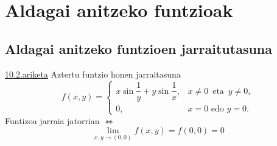\chapter{Aldagai anitzeko funtzioak}
\section{Aldagai anitzeko funtzioen jarraitutasuna}
\underline{10.2.ariketa} Aztertu funtzio honen jarraitasuna
$$f(x,y) = \left\{ \begin{array}{cl}
		x\sin \dfrac{1}{y} +y \sin \dfrac{1}{x},  &  x \neq 0 \, \mbox{ eta } \, y \neq 0, \\
                 0,	                                &  x=0 \mbox{ edo } y=0.
		   \end{array} \right. $$
Funtizoa jarraia jatorrian $\Longleftrightarrow$
\[
\lim_{x,y \to (0,0)}f(x,y)=f(0,0)=0
\]

